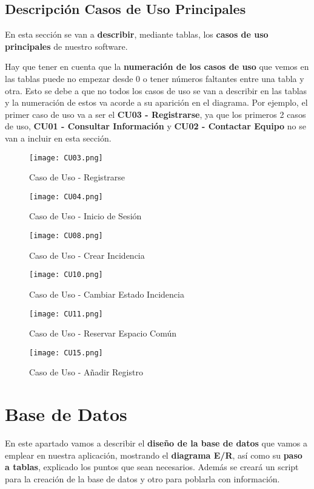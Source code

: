 \subsection{Descripción Casos de Uso Principales}
En esta sección se van a \textbf{describir}, mediante tablas, los \textbf{casos de uso principales} de nuestro software. 

Hay que tener en cuenta que la \textbf{numeración de los casos de uso} que vemos en las tablas puede no empezar desde 0 o tener números faltantes entre una tabla y otra. Esto se debe a que no todos los casos de uso se van a describir en las tablas y la numeración de estos va acorde a su aparición en el diagrama. Por ejemplo, el primer caso de uso va a ser el \textbf{CU03 - Registrarse}, ya que los primeros 2 casos de uso, \textbf{CU01 - Consultar Información} y \textbf{CU02 - Contactar Equipo} no se van a incluir en esta sección.

\begin{figure}[ht]
	\centering
	\texttt{[image: CU03.png]}
	\caption{Caso de Uso - Registrarse}
\end{figure}

\begin{figure}[H]
	\centering
	\texttt{[image: CU04.png]}
	\caption{Caso de Uso - Inicio de Sesión}
\end{figure}

\begin{figure}[H]
	\centering
	\texttt{[image: CU08.png]}
	\caption{Caso de Uso - Crear Incidencia}
\end{figure}

\begin{figure}[H]
	\centering
	\texttt{[image: CU10.png]}
	\caption{Caso de Uso - Cambiar Estado Incidencia}
\end{figure}

\begin{figure}[H]
	\centering
	\texttt{[image: CU11.png]}
	\caption{Caso de Uso - Reservar Espacio Común}
\end{figure}

\begin{figure}[H]
	\centering
	\texttt{[image: CU15.png]}
	\caption{Caso de Uso - Añadir Registro}
\end{figure}


\section{Base de Datos}
En este apartado vamos a describir el \textbf{diseño de la base de datos} que vamos a emplear en nuestra aplicación, mostrando el \textbf{diagrama E/R}, así como su \textbf{paso a tablas}, explicado los puntos que sean necesarios. Además se creará un script para la creación de la base de datos y otro para poblarla con información.

